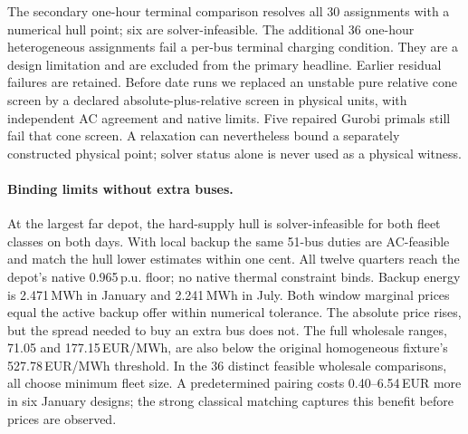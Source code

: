 \documentclass[11pt]{article}
\theoremstyle{definition}\newtheorem{definition}[theorem]{Definition}
\theoremstyle{remark}\newtheorem{remark}[theorem]{Remark}
\begin{document}
The secondary one-hour terminal comparison resolves all 30 assignments
with a numerical hull point; six are solver-infeasible. The additional
36 one-hour heterogeneous assignments fail a per-bus terminal charging
condition. They are a design limitation and are excluded from the primary
headline. Earlier residual failures are retained. Before date runs we
replaced an unstable pure relative cone screen by a declared absolute-plus-relative
screen in physical units, with independent AC agreement and native limits.
Five repaired Gurobi primals still fail that cone screen. A relaxation
can nevertheless bound a separately constructed physical point; solver
status alone is never used as a physical witness.

\paragraph{Binding limits without extra buses.}
At the largest far depot, the hard-supply hull is solver-infeasible for
both fleet classes on both days. With local backup the same 51-bus duties
are AC-feasible and match the hull lower estimates within one cent.
All twelve quarters reach the depot's native 0.965\,p.u. floor; no native
thermal constraint binds. Backup energy is 2.471\,MWh in January and
2.241\,MWh in July. Both window marginal prices equal the active backup
offer within numerical tolerance. The absolute price rises, but the spread
needed to buy an extra bus does not. The full wholesale ranges, 71.05 and
177.15\,EUR/MWh, are also below the original homogeneous fixture's
527.78\,EUR/MWh threshold. In the 36 distinct feasible wholesale comparisons,
all choose minimum fleet size. A predetermined pairing costs 0.40--6.54\,EUR
more in six January designs; the strong classical matching captures this
benefit before prices are observed.
\end{document}
